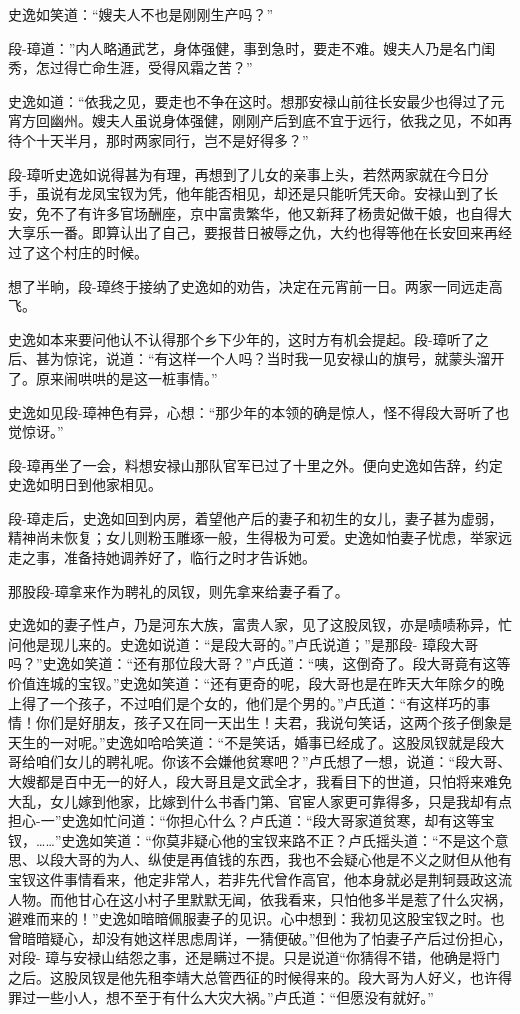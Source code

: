 \documentclass[12pt,oneside]{book}
\begin{document}
史逸如笑道：``嫂夫人不也是刚刚生产吗？''

段-璋道：''内人略通武艺，身体强健，事到急时，要走不难。嫂夫人乃是名门闺秀，怎过得亡命生涯，受得风霜之苦？''

史逸如道：``依我之见，要走也不争在这时。想那安禄山前往长安最少也得过了元宵方回幽州。嫂夫人虽说身体强健，刚刚产后到底不宜于远行，依我之见，不如再待个十天半月，那时两家同行，岂不是好得多？''

段-璋听史逸如说得甚为有理，再想到了儿女的亲事上头，若然两家就在今日分手，虽说有龙凤宝钗为凭，他年能否相见，却还是只能听凭天命。安禄山到了长安，免不了有许多官场酬座，京中富贵繁华，他又新拜了杨贵妃做干娘，也自得大大享乐一番。即算认出了自己，要报昔日被辱之仇，大约也得等他在长安回来再经过了这个村庄的时候。

想了半晌，段-璋终于接纳了史逸如的劝告，决定在元宵前一日。两家一同远走高飞。

史逸如本来要问他认不认得那个乡下少年的，这时方有机会提起。段-璋听了之后、甚为惊诧，说道：``有这样一个人吗？当时我一见安禄山的旗号，就蒙头溜开了。原来闹哄哄的是这一桩事情。''

史逸如见段-璋神色有异，心想：``那少年的本领的确是惊人，怪不得段大哥听了也觉惊讶。''

段-璋再坐了一会，料想安禄山那队官军已过了十里之外。便向史逸如告辞，约定史逸如明日到他家相见。

段-璋走后，史逸如回到内房，着望他产后的妻子和初生的女儿，妻子甚为虚弱，精神尚未恢复；女儿则粉玉雕琢一般，生得极为可爱。史逸如怕妻子忧虑，举家远走之事，准备持她调养好了，临行之时才告诉她。

那股段-璋拿来作为聘礼的凤钗，则先拿来给妻子看了。

史逸如的妻子性卢，乃是河东大族，富贵人家，见了这股凤钗，亦是啧啧称异，忙问他是现儿来的。史逸如说道：``是段大哥的。''卢氏说道；''是那段-
璋段大哥吗？''史逸如笑道：``还有那位段大哥？''卢氏道：``咦，这倒奇了。段大哥竟有这等价值连城的宝钗。''史逸如笑道：``还有更奇的呢，段大哥也是在昨天大年除夕的晚上得了一个孩子，不过咱们是个女的，他们是个男的。''卢氏道：``有这样巧的事情！你们是好朋友，孩子又在同一天出生！夫君，我说句笑话，这两个孩子倒象是天生的一对呢。''史逸如哈哈笑道：``不是笑话，婚事已经成了。这股凤钗就是段大哥给咱们女儿的聘礼呢。你该不会嫌他贫寒吧？''卢氏想了一想，说道：``段大哥、大嫂都是百中无一的好人，段大哥且是文武全才，我看目下的世道，只怕将来难免大乱，女儿嫁到他家，比嫁到什么书香门第、官宦人家更可靠得多，只是我却有点担心-一''史逸如忙问道：``你担心什么？卢氏道：``段大哥家道贫寒，却有这等宝钗，\ldots\ldots{}''史逸如笑道：``你莫非疑心他的宝钗来路不正？卢氏摇头道：``不是这个意思、以段大哥的为人、纵使是再值钱的东西，我也不会疑心他是不义之财但从他有宝钗这件事情看来，他定非常人，若非先代曾作高官，他本身就必是荆轲聂政这流人物。而他甘心在这小村子里默默无闻，依我看来，只怕他多半是惹了什么灾祸，避难而来的！''史逸如暗暗佩服妻子的见识。心中想到：我初见这股宝钗之时。也曾暗暗疑心，却没有她这样思虑周详，一猜便破。''但他为了怕妻子产后过份担心，对段-
璋与安禄山结怨之事，还是瞒过不提。只是说道``你猜得不错，他确是将门之后。这股凤钗是他先租李靖大总管西征的时候得来的。段大哥为人好义，也许得罪过一些小人，想不至于有什么大灾大祸。''卢氏道：``但愿没有就好。''
\end{document}
